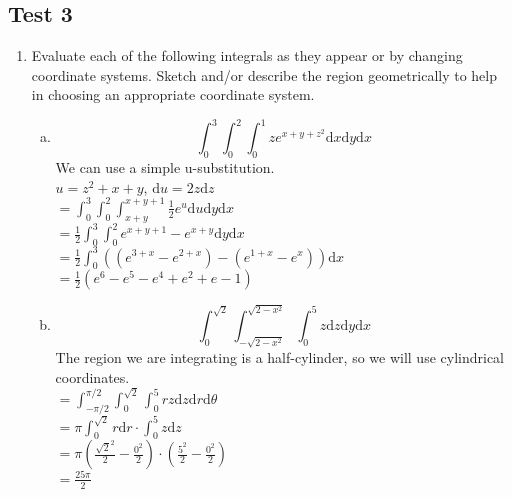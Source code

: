 \subsection{Test 3}
\begin{enumerate}
	\item Evaluate each of the following integrals as they appear or by changing coordinate systems. Sketch and/or describe the region geometrically to help in choosing an appropriate coordinate system.
	\begin{enumerate}[a.]
		\item \begin{equation*}
			\int_{0}^{3}{\int_{0}^{2}{\int_{0}^{1}{ze^{x+y+z^2}\mathrm{d}x}\mathrm{d}y}\mathrm{d}x}
		\end{equation*}
		\indent
		We can use a simple u-substitution.\\
		$u = z^2 + x + y$, $\mathrm{d}u = 2z\mathrm{d}z$\\
		$= \int_{0}^{3}{\int_{0}^{2}{\int_{x+y}^{x+y+1}{\frac{1}{2}e^{u}\mathrm{d}u}\mathrm{d}y}\mathrm{d}x}$\\
		$= \frac{1}{2}\int_{0}^{3}{\int_{0}^{2}{e^{x+y+1} - e^{x+y}\mathrm{d}y}\mathrm{d}x}$\\
		$= \frac{1}{2}\int_{0}^{3}{\left((e^{3+x}-e^{2+x}) - (e^{1+x}-e^{x})\right)\mathrm{d}x}$\\
		$= \frac{1}{2}(e^6 - e^5 - e^4 + e^2 + e - 1)$\\
		
		\item \begin{equation*}
			\int_{0}^{\sqrt{2}}{\int_{-\sqrt{2-x^2}}^{\sqrt{2-x^2}}{\int_{0}^{5}{z\mathrm{d}z}\mathrm{d}y}\mathrm{d}x}
		\end{equation*}
		\indent
		The region we are integrating is a half-cylinder, so we will use cylindrical coordinates.\\
		$= \int_{-\pi/2}^{\pi/2}{\int_{0}^{\sqrt{2}}{\int_{0}^{5}{rz\mathrm{d}z}\mathrm{d}r}\mathrm{d}\theta}$\\
		$= \pi\int_{0}^{\sqrt{2}}{r\mathrm{d}r}\cdot\int_{0}^{5}{z\mathrm{d}z}$\\
		$= \pi\left(\frac{\sqrt{2}^{2}}{2} - \frac{0^2}{2}\right) \cdot \left(\frac{5^2}{2} - \frac{0^2}{2}\right)$\\
		$= \frac{25\pi}{2}$\\
		

\end{enumerate}
\end{enumerate}
